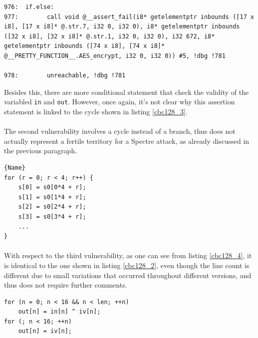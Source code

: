 \documentclass[12pt,a4paper]{book}
\theoremstyle{definition}
\begin{document}
	\begin{lstlisting}[caption={\texttt{assembly.ll}}, numbers=none]
976:  if.else:
977:  		call void @__assert_fail(i8* getelementptr inbounds ([17 x i8], [17 x i8]* @.str.7, i32 0, i32 0), i8* getelementptr inbounds ([32 x i8], [32 x i8]* @.str.1, i32 0, i32 0), i32 672, i8* getelementptr inbounds ([74 x i8], [74 x i8]* @__PRETTY_FUNCTION__.AES_encrypt, i32 0, i32 0)) #5, !dbg !781

978:  		unreachable, !dbg !781 		
	\end{lstlisting}
	
	Besides this, there are more conditional statement that check the validity of the variabled \texttt{in} and \texttt{out}. However, once again, it's not clear why this assertion statement is linked to the cycle shown in listing \ref{cbc128_3}.
	
	\paragraph{} The second vulnerability involves a cycle instead of a branch, thus does not actually represent a fertile territory for a Spectre attack, as already discussed in the previous paragraph. 

	\begin{minipage}{.5\textwidth}
		\begin{lstlisting}[caption={\texttt{aes\_core.c}}, label=aes-core4, firstnumber=432]{Name}
for (r = 0; r < 4; r++) {
	s[0] = s0[0*4 + r];
	s[1] = s0[1*4 + r];
	s[2] = s0[2*4 + r];
	s[3] = s0[3*4 + r];
	...
}
		\end{lstlisting}
	\end{minipage}
	\vspace{3mm}

	\paragraph{} With respect to the third vulnerability, as one can see from listing \ref{cbc128_4}, it is identical to the one shown in listing \ref{cbc128_2}, even though the line count is different due to small variations that occurred throughout different versions, and thus does not require further comments.

	\begin{minipage}{.5\textwidth}
		\begin{lstlisting}[caption={\texttt{cbc128.c}}, label=cbc128_4, firstnumber=60]
for (n = 0; n < 16 && n < len; ++n)
	out[n] = in[n] ^ iv[n];
for (; n < 16; ++n)
	out[n] = iv[n];
		\end{lstlisting}
	\end{minipage}
\end{document}

